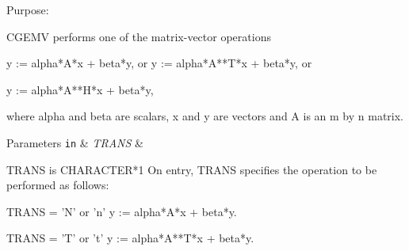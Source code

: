 \begin{DoxyParagraph}{Purpose\+: }
\begin{DoxyVerb} CGEMV performs one of the matrix-vector operations

    y := alpha*A*x + beta*y,   or   y := alpha*A**T*x + beta*y,   or

    y := alpha*A**H*x + beta*y,

 where alpha and beta are scalars, x and y are vectors and A is an
 m by n matrix.\end{DoxyVerb}
 
\end{DoxyParagraph}

\begin{DoxyParams}[1]{Parameters}
\mbox{\tt in}  & {\em T\+R\+A\+N\+S} & \begin{DoxyVerb}          TRANS is CHARACTER*1
           On entry, TRANS specifies the operation to be performed as
           follows:

              TRANS = 'N' or 'n'   y := alpha*A*x + beta*y.

              TRANS = 'T' or 't'   y := alpha*A**T*x + beta*y.


\end{DoxyVerb}
\end{DoxyParams}
